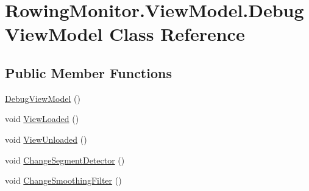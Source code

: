 \hypertarget{class_rowing_monitor_1_1_view_model_1_1_debug_view_model}{}\section{Rowing\+Monitor.\+View\+Model.\+Debug\+View\+Model Class Reference}
\label{class_rowing_monitor_1_1_view_model_1_1_debug_view_model}
\subsection*{Public Member Functions}
\begin{DoxyCompactItemize}
\item 
\hyperlink{class_rowing_monitor_1_1_view_model_1_1_debug_view_model_a9a09d0e5bcf1e919b8bff6fd9e7bc446}{Debug\+View\+Model} ()
\item 
void \hyperlink{class_rowing_monitor_1_1_view_model_1_1_debug_view_model_ac98ef68bcbe80ff74e742877c0bad04a}{View\+Loaded} ()
\item 
void \hyperlink{class_rowing_monitor_1_1_view_model_1_1_debug_view_model_ad8fab68504357f6e002e8a3e8ef0522b}{View\+Unloaded} ()
\item 
void \hyperlink{class_rowing_monitor_1_1_view_model_1_1_debug_view_model_a13676053f64717dc6e3dded15b158016}{Change\+Segment\+Detector} ()
\item 
void \hyperlink{class_rowing_monitor_1_1_view_model_1_1_debug_view_model_a874acc432d71f1cc9118ff8fda71a2f6}{Change\+Smoothing\+Filter} ()
\end{DoxyCompactItemize}
